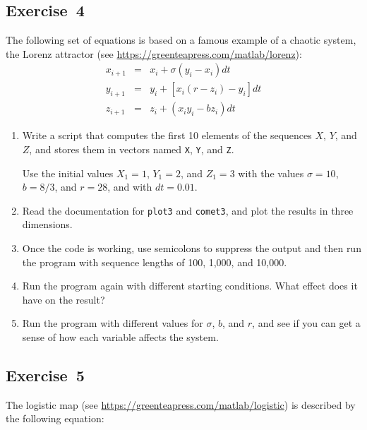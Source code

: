 \subsection{Exercise~4}
  The following set of equations is based on a famous example of a chaotic system, the Lorenz attractor (see \url{https://greenteapress.com/matlab/lorenz}):
%
\begin{eqnarray*}
x_{i+1} &=& x_i + \sigma \left( y_i - x_i \right) dt  \\
y_{i+1} &=& y_i + \left[ x_i (r - z_i) - y_i \right] dt   \\
z_{i+1} &=& z_i + \left( x_i y_i - b z_i \right) dt
\end{eqnarray*}
%
\begin{enumerate}

\item Write a script that computes the first 10 elements of the sequences
$X$, $Y$, and $Z$, and stores them in vectors named \lstinline{X}, \lstinline{Y},
and \lstinline{Z}.

Use the initial values $X_1 = 1$, $Y_1 = 2$, and $Z_1 = 3$ with the values
$\sigma = 10$, $b = 8/3$, and $r = 28$, and with $dt = 0.01$.

\item Read the documentation for \lstinline{plot3} and \lstinline{comet3}, and
plot the results in three dimensions.

\item Once the code is working, use semicolons to suppress the output
and then run the program with sequence lengths of 100, 1,000, and 10,000.

\item Run the program again with different starting conditions.
What effect does it have on the result?

\item Run the program with different values for $\sigma$, $b$, and $r$,
and see if you can get a sense of how each variable affects the
system.

\end{enumerate}




\subsection{Exercise~5}
The logistic map (see \url{https://greenteapress.com/matlab/logistic}) is described by the following equation:

